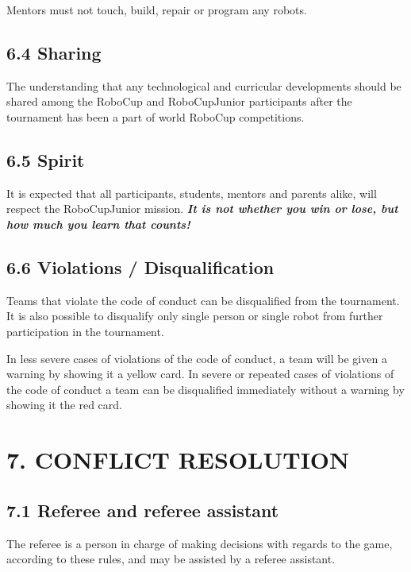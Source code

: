 \documentclass{article}
\begin{document}
Mentors must not touch, build, repair or program any robots. 

\subsection{6.4 Sharing \label{ref-044}}

The understanding that any technological and curricular developments should be shared among the RoboCup and RoboCupJunior participants after the tournament has been a part of world RoboCup competitions. 

\subsection{6.5 Spirit \label{ref-045}}

It is expected that all participants, students, mentors and parents alike, will respect the RoboCupJunior mission. \textbf{\textit{It is not whether you win or lose, but how much you learn that counts!}} 

\subsection{6.6 Violations / Disqualification \label{ref-046}}

Teams that violate the code of conduct can be disqualified from the tournament. It is also possible to disqualify only single person or single robot from further participation in the tournament. 

In less severe cases of violations of the code of conduct, a team will be given a warning by showing it a yellow card. In severe or repeated cases of violations of the code of conduct a team can be disqualified immediately without a warning by showing it the red card. 

\section{7. CONFLICT RESOLUTION \label{ref-047}}

\subsection{7.1 Referee and referee assistant \label{ref-048}}

\textcolor{color-5}{The referee is a person in charge of making decisions with regards to the game, according to these rules, and may be assisted by a referee assistant.}
\end{document}
